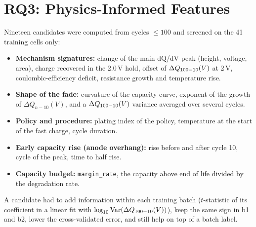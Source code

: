 \section{RQ3: Physics-Informed Features}
\label{sec:rq3}

Nineteen candidates were computed from cycles $\le100$ and screened on the
41 training cells only:
\begin{itemize}
  \item \textbf{Mechanism signatures:} change of the main dQ/dV peak (height,
  voltage, area), charge recovered in the 2.0\,V hold, offset of $\Delta Q_{100-10}(V)$ at
  2\,V, coulombic-efficiency deficit, resistance growth and temperature rise.
  \item \textbf{Shape of the fade:} curvature of the capacity curve, exponent
  of the growth of $\Delta Q_{n-10}(V)$, and a $\Delta Q_{100-10}(V)$ variance averaged over
  several cycles.
  \item \textbf{Policy and procedure:} plating index of the policy,
  temperature at the start of the fast charge, cycle duration.
  \item \textbf{Early capacity rise (anode overhang):} rise before and after
  cycle 10, cycle of the peak, time to half rise.
  \item \textbf{Capacity budget:} \texttt{margin\_rate}, the capacity above
  end of life divided by the degradation rate.
\end{itemize}
A candidate had to add information within each training batch ($t$-statistic
of its coefficient in a linear fit with $\log_{10}\mathrm{Var}(\Delta Q_{100-10}(V))$), keep
the same sign in b1 and b2, lower the cross-validated error, and still help
on top of a batch label.

